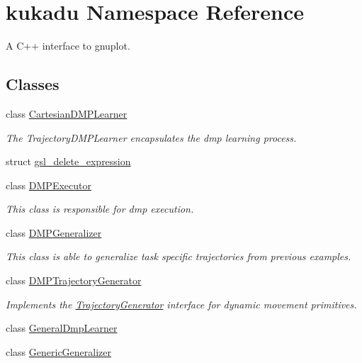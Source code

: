 \hypertarget{namespacekukadu}{\section{kukadu Namespace Reference}
\label{namespacekukadu}
}


A C++ interface to gnuplot.  


\subsection*{Classes}
\begin{DoxyCompactItemize}
\item 
class \hyperlink{classkukadu_1_1CartesianDMPLearner}{Cartesian\-D\-M\-P\-Learner}
\begin{DoxyCompactList}\small\item\em The Trajectory\-D\-M\-P\-Learner encapsulates the dmp learning process. \end{DoxyCompactList}\item 
struct \hyperlink{structkukadu_1_1gsl__delete__expression}{gsl\-\_\-delete\-\_\-expression}
\item 
class \hyperlink{classkukadu_1_1DMPExecutor}{D\-M\-P\-Executor}
\begin{DoxyCompactList}\small\item\em This class is responsible for dmp execution. \end{DoxyCompactList}\item 
class \hyperlink{classkukadu_1_1DMPGeneralizer}{D\-M\-P\-Generalizer}
\begin{DoxyCompactList}\small\item\em This class is able to generalize task specific trajectories from previous examples. \end{DoxyCompactList}\item 
class \hyperlink{classkukadu_1_1DMPTrajectoryGenerator}{D\-M\-P\-Trajectory\-Generator}
\begin{DoxyCompactList}\small\item\em Implements the \hyperlink{classkukadu_1_1TrajectoryGenerator}{Trajectory\-Generator} interface for dynamic movement primitives. \end{DoxyCompactList}\item 
class \hyperlink{classkukadu_1_1GeneralDmpLearner}{General\-Dmp\-Learner}
\item 
class \hyperlink{classkukadu_1_1GenericGeneralizer}{Generic\-Generalizer}
\item 

\end{DoxyCompactItemize}
